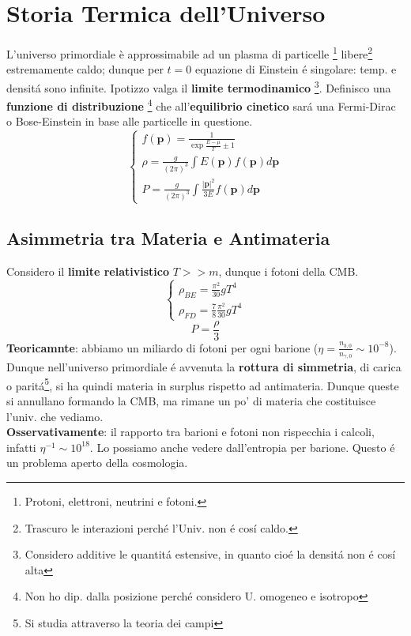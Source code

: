 \documentclass[12pt, a4paper]{article}
\begin{document}
\section{Storia Termica dell'Universo }
L'universo primordiale è approssimabile ad un plasma di particelle \footnote{Protoni, elettroni, neutrini e fotoni.} libere\footnote{Trascuro le interazioni perch\'{e} l'Univ. non \'{e} cos\'{i} caldo.} estremamente caldo; dunque per  $t=0$ equazione di Einstein \'{e} singolare: temp. e densit\'{a} sono infinite. Ipotizzo valga il \textbf{limite termodinamico} \footnote{Considero additive le quantit\'{a} estensive, in quanto cio\'{e} la densit\'{a} non \'{e} cos\'{i} alta}. Definisco una \textbf{funzione di distribuzione} \footnote{Non ho dip. dalla posizione perch\'{e} considero U. omogeneo e isotropo} che all'\textbf{equilibrio cinetico} sar\'{a} una Fermi-Dirac o Bose-Einstein in base alle particelle in questione.
\begin{equation}
     \begin{cases}
        f(\textbf{p})=\frac{1}{\exp{\frac{E-\mu}{T}}\pm 1}
        \\
        \rho=\frac{g}{(2\pi)^3}\int E(\textbf{p}) f(\textbf{p})d\textbf{p}
        \\
        P=\frac{g}{(2\pi)^3}\int \frac{|\textbf{p}|^2}{3E} f(\textbf{p})d\textbf{p}
     \end{cases}
\end{equation}
\subsection{Asimmetria tra Materia e Antimateria}
Considero il \textbf{limite relativistico} $T >> m$, dunque i fotoni della CMB.
\begin{equation}
     \begin{cases}
        \rho_{BE}=\frac{\pi^2}{30}gT^4
        \\
        \rho_{FD}=\frac{7}{8}\frac{\pi^2}{30}gT^4
     \end{cases}
\end{equation}
\begin{equation}
    P=\frac{\rho}{3}
\end{equation}
\textbf{Teoricamnte}: abbiamo un miliardo di fotoni per ogni barione ($\eta=\frac{n_{b,0}}{n_{\gamma,0}}\sim 10^{-8}$). Dunque nell'universo primordiale \'{e} avvenuta la \textbf{rottura di simmetria}, di carica o parit\'{a}\footnote{Si studia attraverso la teoria dei campi}, si ha quindi materia in surplus rispetto ad antimateria. Dunque queste si annullano formando la CMB, ma rimane un po' di materia che costituisce l'univ. che vediamo.\\
\textbf{Osservativamente}: il rapporto tra barioni e fotoni non rispecchia i calcoli, infatti $\eta^{-1}\sim 10^{18}$. Lo possiamo anche vedere dall'entropia per barione. Questo \'{e} un problema aperto della cosmologia.
\end{document}
